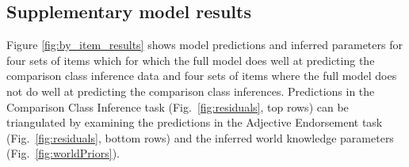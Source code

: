 \documentclass[doc]{apa6}
\begin{document}
\subsection{Supplementary model results}

Figure \ref{fig:by_item_results} shows model predictions and inferred parameters for four sets of items which for which the full model does well at predicting the comparison class inference data and four sets of items where the full model does not do well at predicting the comparison class inferences. Predictions in the Comparison Class Inference task (Fig.~\ref{fig:residuals}, top rows) can be triangulated by examining the predictions in the Adjective Endorsement task  (Fig.~\ref{fig:residuals}, bottom rows) and the inferred world knowledge parameters (Fig.~\ref{fig:worldPriors}).










  
  


\end{document}
